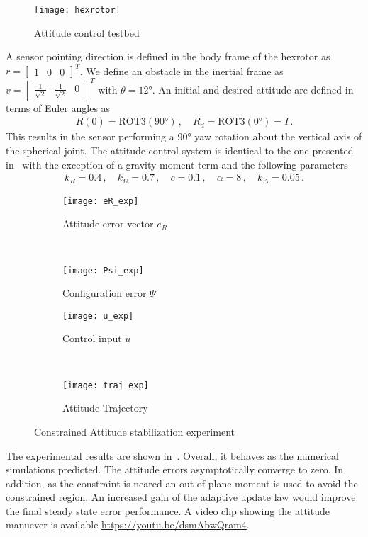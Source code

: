 \documentclass[letterpaper, 10 pt, conference]{ieeeconf}  %
\begin{document}
\begin{figure}
	\texttt{[image: hexrotor]}
	\caption{Attitude control testbed~\label{fig:hexrotor}}
\end{figure}
A sensor pointing direction is defined in the body frame of the hexrotor as \( r = \begin{bmatrix} 1 & 0 & 0 \end{bmatrix}^T \).
We define an obstacle in the inertial frame as \( v = \begin{bmatrix} \frac{1}{\sqrt{2}} & \frac{1}{\sqrt{2}} & 0\end{bmatrix}^T \) with \( \theta = \ang{12} \).
An initial and desired attitude are defined in terms of Euler angles as
\begin{gather}
	R(0) = \text{ROT3}(\ang{90}) \, , \quad R_d = \text{ROT3}(\ang{0})=I \, .
\end{gather}                                
This results in the sensor performing a \ang{90} yaw rotation about the vertical axis of the spherical joint.
The attitude control system is identical to the one presented in~ with the exception of a gravity moment term and the following parameters
\begin{gather*}
	k_R = 0.4 \, , \quad k_\Omega = 0.7 \, , \quad c = 0.1 \, ,\quad \alpha = 8 \, , \quad k_\Delta = 0.05 \, .
\end{gather*}
\begin{figure} 
	\centering 
	\begin{subfigure}[htbp]{0.5\columnwidth} 
		\texttt{[image: eR\_exp]} 
		\caption{Attitude error vector \(e_R\) } \label{fig:eR_exp} 
	\end{subfigure}~ %
	\begin{subfigure}[htbp]{0.5\columnwidth} 
		\texttt{[image: Psi\_exp]} 
		\caption{Configuration error \( \Psi \)} \label{fig:Psi_exp} 
	\end{subfigure}
	
	\begin{subfigure}[htbp]{0.5\columnwidth} 
		\texttt{[image: u\_exp]} 
		\caption{Control input \( u\)} \label{fig:u_exp} 
	\end{subfigure}~
	\begin{subfigure}[htbp]{0.5\columnwidth} 
		\texttt{[image: traj\_exp]} 
		\caption{Attitude Trajectory} \label{fig:traj_exp} 
	\end{subfigure}
	\caption{Constrained Attitude stabilization experiment}
	\label{fig:exp} 
\end{figure}
The experimental results are shown in~.
Overall, it behaves as the numerical simulations predicted.
The attitude errors asymptotically converge to zero. 
In addition, as the constraint is neared an out-of-plane moment is used to avoid the constrained region.
An increased gain of the adaptive update law would improve the final steady state error performance.
A video clip showing the attitude manuever is available \url{https://youtu.be/dsmAbwQram4}.
\end{document}
